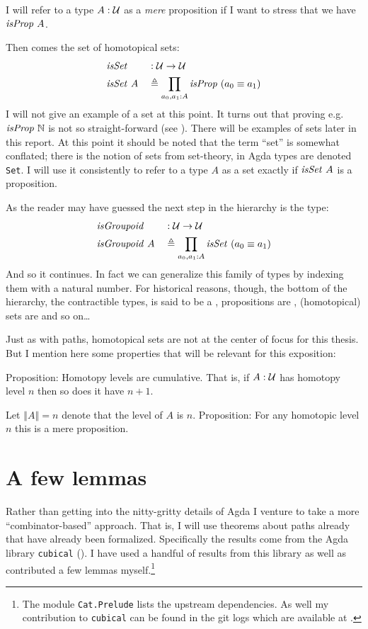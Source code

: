 I will refer to a type $A \mathrel{:} \mathcal{U}$ as a \emph{mere} proposition if I want to
stress that we have $\isProp\ A$.

Then comes the set of homotopical sets:
%
\begin{equation}
\begin{aligned}
& \isSet    && \tp \MCU \to \MCU \\
& \isSet\ A && \defeq \prod_{a_0, a_1 \tp A} \isProp\ (a_0 \equiv a_1)
\end{aligned}
\end{equation}
%
I will not give an example of a set at this point. It turns out that proving
e.g.\ $\isProp\ \bN$ is not so straight-forward (see \cite[\S3.1.4]{hott-2013}).
There will be examples of sets later in this report. At this point it should be
noted that the term ``set'' is somewhat conflated; there is the notion of sets
from set-theory, in Agda types are denoted \texttt{Set}. I will use it
consistently to refer to a type $A$ as a set exactly if $\isSet\ A$ is a
proposition.

As the reader may have guessed the next step in the hierarchy is the type:
%
\begin{equation}
\begin{aligned}
& \isGroupoid    && \tp \MCU \to \MCU \\
& \isGroupoid\ A && \defeq \prod_{a_0, a_1 \tp A} \isSet\ (a_0 \equiv a_1)
\end{aligned}
\end{equation}
%
And so it continues. In fact we can generalize this family of types by indexing
them with a natural number. For historical reasons, though, the bottom of the
hierarchy, the contractible types, is said to be a , propositions are , (homotopical)
sets are  and so on\ldots

Just as with paths, homotopical sets are not at the center of focus for this
thesis. But I mention here some properties that will be relevant for this
exposition:

Proposition: Homotopy levels are cumulative. That is, if $A \mathrel{:} \mathcal{U}$ has
homotopy level $n$ then so does it have $n + 1$.

Let $\left\Vert A \right\Vert = n$ denote that the level of $A$ is $n$.
Proposition: For any homotopic level $n$ this is a mere proposition.
%
\section{A few lemmas}
Rather than getting into the nitty-gritty details of Agda I venture to
take a more ``combinator-based'' approach. That is, I will use
theorems about paths already that have already been formalized.
Specifically the results come from the Agda library \texttt{cubical}
(\cite{cubical-demo}). I have used a handful of results from this
library as well as contributed a few lemmas myself.\footnote{The
  module \texttt{Cat.Prelude} lists the upstream dependencies. As well
  my contribution to \texttt{cubical} can be found in the git logs
  which are available at
  .}

